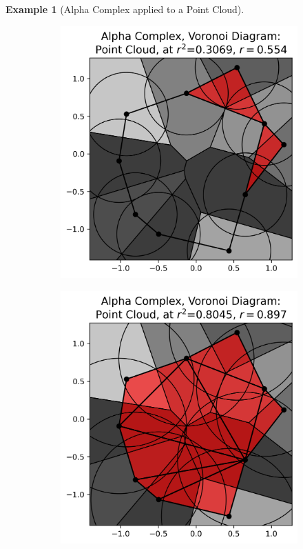 \documentclass[ma]{uncgdissertationexp}
\theoremstyle{plain}
\theoremstyle{definition}
\newtheorem{example}[theorem]{Example}
\theoremstyle{remark}
\begin{document}
\begin{example}[Alpha Complex applied to a Point Cloud]
\begin{figure}[H]
\begin{subfigure}[b]{0.27\textwidth}
    \end{subfigure}
    \begin{subfigure}[b]{0.27\textwidth}
        \includegraphics[width=\textwidth]{point_cloud_plot_alpha_5.png}
    \end{subfigure}
    \begin{subfigure}[b]{0.27\textwidth}
        \includegraphics[width=\textwidth]{point_cloud_plot_alpha_6.png}

\end{subfigure}
\end{figure}
\end{example}
\end{document}
